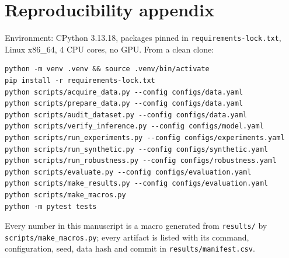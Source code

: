\documentclass[11pt,a4paper]{article}
\begin{document}
\section{Reproducibility appendix}
Environment: CPython 3.13.18, packages pinned in \texttt{requirements-lock.txt}, Linux x86\_64, 4 CPU cores, no GPU. From a clean clone:
\begin{verbatim}
python -m venv .venv && source .venv/bin/activate
pip install -r requirements-lock.txt
python scripts/acquire_data.py --config configs/data.yaml
python scripts/prepare_data.py --config configs/data.yaml
python scripts/audit_dataset.py --config configs/data.yaml
python scripts/verify_inference.py --config configs/model.yaml
python scripts/run_experiments.py --config configs/experiments.yaml
python scripts/run_synthetic.py --config configs/synthetic.yaml
python scripts/run_robustness.py --config configs/robustness.yaml
python scripts/evaluate.py --config configs/evaluation.yaml
python scripts/make_results.py --config configs/evaluation.yaml
python scripts/make_macros.py
python -m pytest tests
\end{verbatim}
\begin{sloppypar}Every number in this manuscript is a macro generated from \texttt{results/} by \texttt{scripts/make\_macros.py}; every artifact is listed with its command, configuration, seed, data hash and commit in \texttt{results/manifest.csv}.\end{sloppypar}
\end{document}
